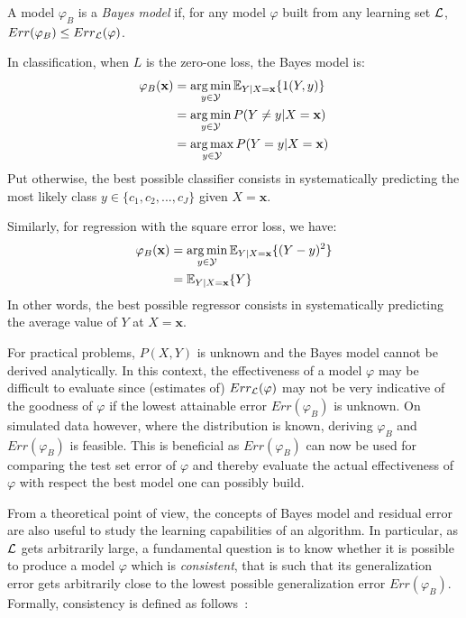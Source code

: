 \begin{definition}
A model $\varphi_B$ is a \emph{Bayes model} if, for any model $\varphi$ built from any
learning set ${\cal L}$, $Err(\varphi_B) \leq Err_{\cal L}(\varphi)$.
\end{definition}

In classification, when $L$ is the zero-one loss, the Bayes model is:
\begin{align}
\varphi_B(\mathbf{x}) &= \operatorname*{arg\,min}_{y \in {\cal Y}} \mathbb{E}_{Y|X=\mathbf{x}} \{ 1(Y, y) \} \nonumber \\
                      &= \operatorname*{arg\,min}_{y \in {\cal Y}} P(Y \neq y|X=\mathbf{x}) \nonumber \\
                      &= \operatorname*{arg\,max}_{y \in {\cal Y}} P(Y = y|X=\mathbf{x}) \label{eqn:bayes-model-classification}
\end{align}
Put otherwise, the best possible classifier
consists in systematically predicting the most likely class $y \in \{c_1, c_2, ..., c_J\}$
given $X=\mathbf{x}$.

Similarly, for regression with the square error loss, we have:
\begin{align}
\varphi_B(\mathbf{x}) &= \operatorname*{arg\,min}_{y \in {\cal Y}} \mathbb{E}_{Y|X=\mathbf{x}} \{ (Y - y)^2 \} \nonumber \\
                      &= \mathbb{E}_{Y|X=\mathbf{x}} \{ Y \} \label{eqn:bayes-model-regression}
\end{align}
In other words, the best possible regressor consists in systematically predicting
the average value of $Y$ at $X=\mathbf{x}$.

For practical problems, $P(X, Y)$ is unknown and the Bayes model cannot be
derived analytically. In this context, the effectiveness of a model $\varphi$
may be difficult to evaluate since (estimates of) $Err_{\cal L}(\varphi)$ may
not be very indicative of the goodness of $\varphi$ if the lowest attainable
error $Err(\varphi_B)$ is unknown. On simulated data however, where the
distribution is known, deriving $\varphi_B$ and $Err(\varphi_B)$ is feasible.
This is beneficial as $Err(\varphi_B)$ can now be used for comparing the
test set error of $\varphi$ and thereby evaluate the
actual effectiveness of $\varphi$ with respect the best model one can
possibly build.

From a theoretical point of view, the concepts of Bayes model and residual
error are also useful to study the learning capabilities of an algorithm. In
particular, as ${\cal L}$ gets arbitrarily large, a fundamental question is to
know whether it is possible to produce a model $\varphi$ which is
\textit{consistent}, that is such that its generalization error gets
arbitrarily close to the lowest possible generalization error $Err(\varphi_B)$.
Formally, consistency is defined as follows~\citep{devroye:1996}:

